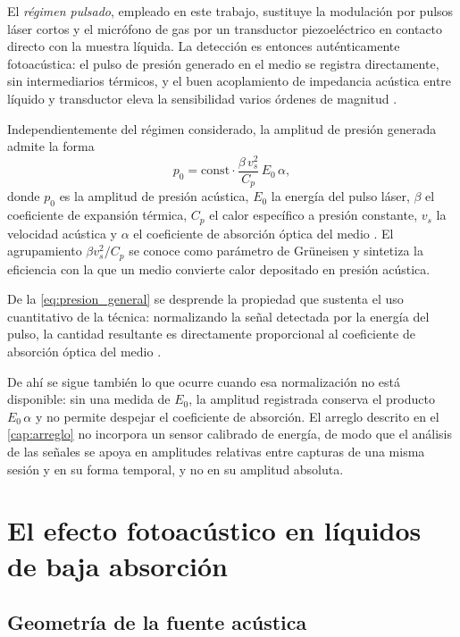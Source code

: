 El \textit{régimen pulsado}, empleado en este trabajo, sustituye la
modulación por pulsos láser cortos y el micrófono de gas por un
transductor piezoeléctrico en contacto directo con la muestra
líquida. La detección es entonces auténticamente fotoacústica: el
pulso de presión generado en el medio se registra directamente, sin
intermediarios térmicos, y el buen acoplamiento de impedancia
acústica entre líquido y transductor eleva la sensibilidad varios
órdenes de magnitud \cite{PatelTam1981}.

Independientemente del régimen considerado, la amplitud de presión
generada admite la forma
\begin{equation}
    p_0 = \text{const} \cdot \frac{\beta\, v_s^2}{C_p}\, E_0\, \alpha,
    \label{eq:presion_general}
\end{equation}
donde $p_0$ es la amplitud de presión acústica, $E_0$ la energía del
pulso láser, $\beta$ el coeficiente de expansión térmica, $C_p$ el
calor específico a presión constante, $v_s$ la velocidad acústica y
$\alpha$ el coeficiente de absorción óptica del medio
\cite{PatelTam1981}. El agrupamiento $\beta v_s^2 / C_p$ se conoce
como parámetro de Grüneisen y sintetiza la eficiencia con la que un
medio convierte calor depositado en presión acústica.

De la \cref{eq:presion_general} se desprende la propiedad que
sustenta el uso cuantitativo de la técnica: normalizando la señal
detectada por la energía del pulso, la cantidad resultante es
directamente proporcional al coeficiente de absorción óptica del
medio \cite{PatelTam1981}.

De ahí se sigue también lo que ocurre cuando esa normalización no
está disponible: sin una medida de $E_0$, la amplitud registrada
conserva el producto $E_0\,\alpha$ y no permite despejar el
coeficiente de absorción. El arreglo descrito en el
\cref{cap:arreglo} no incorpora un sensor calibrado de energía, de
modo que el análisis de las señales se apoya en amplitudes relativas
entre capturas de una misma sesión y en su forma temporal, y no en su
amplitud absoluta.

\section{El efecto fotoacústico en líquidos de baja absorción}
\label{sec:fotoacustico_liquidos}

\subsection*{Geometría de la fuente acústica}


